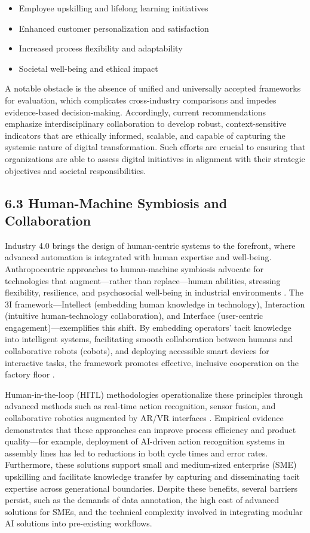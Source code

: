 \documentclass[11pt]{article}
\begin{document}
\begin{itemize}
    \item Employee upskilling and lifelong learning initiatives
    \item Enhanced customer personalization and satisfaction
    \item Increased process flexibility and adaptability
    \item Societal well-being and ethical impact
\end{itemize}

A notable obstacle is the absence of unified and universally accepted frameworks for evaluation, which complicates cross-industry comparisons and impedes evidence-based decision-making. Accordingly, current recommendations emphasize interdisciplinary collaboration to develop robust, context-sensitive indicators that are ethically informed, scalable, and capable of capturing the systemic nature of digital transformation. Such efforts are crucial to ensuring that organizations are able to assess digital initiatives in alignment with their strategic objectives and societal responsibilities.

\subsection{6.3 Human-Machine Symbiosis and Collaboration}

Industry 4.0 brings the design of human-centric systems to the forefront, where advanced automation is integrated with human expertise and well-being. Anthropocentric approaches to human-machine symbiosis advocate for technologies that augment—rather than replace—human abilities, stressing flexibility, resilience, and psychosocial well-being in industrial environments \cite{ref90}. The 3I framework—Intellect (embedding human knowledge in technology), Interaction (intuitive human-technology collaboration), and Interface (user-centric engagement)—exemplifies this shift. By embedding operators’ tacit knowledge into intelligent systems, facilitating smooth collaboration between humans and collaborative robots (cobots), and deploying accessible smart devices for interactive tasks, the framework promotes effective, inclusive cooperation on the factory floor \cite{ref90}.

Human-in-the-loop (HITL) methodologies operationalize these principles through advanced methods such as real-time action recognition, sensor fusion, and collaborative robotics augmented by AR/VR interfaces \cite{ref17,ref27,ref29,ref37,ref38,ref42,ref43,ref45,ref46,ref54,ref89}. Empirical evidence demonstrates that these approaches can improve process efficiency and product quality—for example, deployment of AI-driven action recognition systems in assembly lines has led to reductions in both cycle times and error rates. Furthermore, these solutions support small and medium-sized enterprise (SME) upskilling and facilitate knowledge transfer by capturing and disseminating tacit expertise across generational boundaries. Despite these benefits, several barriers persist, such as the demands of data annotation, the high cost of advanced solutions for SMEs, and the technical complexity involved in integrating modular AI solutions into pre-existing workflows.
\end{document}
